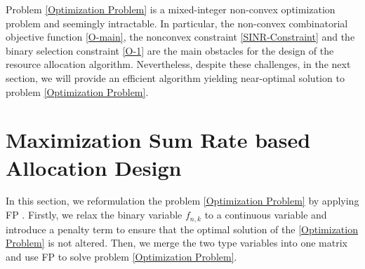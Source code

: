 \documentclass[a4paper,journal,10pt]{IEEEtran}
\begin{document}
Problem \eqref{Optimization Problem} is a mixed-integer non-convex optimization problem and seemingly intractable.
In particular, the non-convex combinatorial objective function \eqref{O-main}, the nonconvex constraint \eqref{SINR-Constraint} and the binary selection constraint \eqref{O-1} are the main obstacles for the design of the resource allocation algorithm.
Nevertheless, despite these challenges, in the next section, we will provide an efficient algorithm yielding near-optimal solution to problem \eqref{Optimization Problem}.

\section{Maximization Sum Rate based Allocation Design}\label{sec:Allocation Design for Sum Rate}
In this section, we reformulation the problem \eqref{Optimization Problem} by applying FP \cite{shen2018fractional}. Firstly, we relax the binary variable $f_{n,k}$ to a continuous variable and introduce a penalty term to ensure that the optimal solution of the \eqref{Optimization Problem} is not altered. Then, we merge the two type variables into one matrix and use FP to solve problem \eqref{Optimization Problem}.
\end{document}
